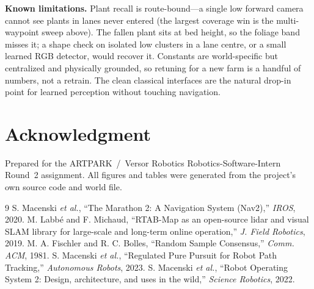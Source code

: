 \documentclass[10pt,journal,twoside]{IEEEtran}
\begin{document}
\textbf{Known limitations.} Plant recall is route-bound---a single low forward camera cannot see plants in lanes never entered (the largest coverage win is the multi-waypoint sweep above). The fallen plant sits at bed height, so the foliage band misses it; a shape check on isolated low clusters in a lane centre, or a small learned RGB detector, would recover it. Constants are world-specific but centralized and physically grounded, so retuning for a new farm is a handful of numbers, not a retrain. The clean classical interfaces are the natural drop-in point for learned perception without touching navigation.

\section*{Acknowledgment}
Prepared for the ARTPARK~/~Versor Robotics Robotics-Software-Intern Round~2 assignment. All figures and tables were generated from the project's own source code and world file.

\begin{thebibliography}{9}
\footnotesize
{} S. Macenski \emph{et al.}, ``The Marathon 2: A Navigation System (Nav2),'' \emph{IROS}, 2020.
 M. Labb\'e and F. Michaud, ``RTAB-Map as an open-source lidar and visual SLAM library for large-scale and long-term online operation,'' \emph{J. Field Robotics}, 2019.
 M. A. Fischler and R. C. Bolles, ``Random Sample Consensus,'' \emph{Comm. ACM}, 1981.
 S. Macenski \emph{et al.}, ``Regulated Pure Pursuit for Robot Path Tracking,'' \emph{Autonomous Robots}, 2023.
 S. Macenski \emph{et al.}, ``Robot Operating System 2: Design, architecture, and uses in the wild,'' \emph{Science Robotics}, 2022.
\end{thebibliography}
\end{document}
